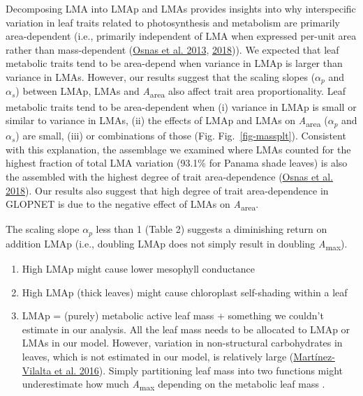 \documentclass[
  12pt,
  a4paper,
,tablecaptionabove
]{scrartcl}
\providecommand{\tightlist}{%
  \setlength{\itemsep}{0pt}\setlength{\parskip}{0pt}}
\begin{document}
Decomposing LMA into LMAp and LMAs provides insights into why
interspecific variation in leaf traits related to photosynthesis and
metabolism are primarily area-dependent (i.e., primarily independent of
LMA when expressed per-unit area rather than mass-dependent
(\protect\hyperlink{ref-Osnas2013}{Osnas et al. 2013},
\protect\hyperlink{ref-Osnas2018}{2018})). We expected that leaf
metabolic traits tend to be area-depend when variance in LMAp is larger
than variance in LMAs. However, our results suggest that the scaling
slopes (\(\alpha_p\) and \(\alpha_s\)) between LMAp, LMAs and
\emph{A}\textsubscript{area} also affect trait area proportionality.
Leaf metabolic traits tend to be area-dependent when (i) variance in
LMAp is small or similar to variance in LMAs, (ii) the effects of LMAp
and LMAs on \emph{A}\textsubscript{area} (\(\alpha_p\) and \(\alpha_s\))
are small, (iii) or combinations of those (Fig. Fig.~\ref{fig-massplt}).
Consistent with this explanation, the assemblage we examined where LMAs
counted for the highest fraction of total LMA variation (93.1\% for
Panama shade leaves) is also the assembled with the highest degree of
trait area-dependence (\protect\hyperlink{ref-Osnas2018}{Osnas et al.
2018}). Our results also suggest that high degree of trait
area-dependence in GLOPNET is due to the negative effect of LMAs on
\emph{A}\textsubscript{area}.

The scaling slope \(\alpha_p\) less than 1 (Table 2) suggests a
diminishing return on addition LMAp (i.e., doubling LMAp does not simply
result in doubling \emph{A}\textsubscript{max}).

\begin{enumerate}
\def\labelenumi{\arabic{enumi}.}
\tightlist
\item
  High LMAp might cause lower mesophyll conductance
\item
  High LMAp (thick leaves) might cause chloroplast self-shading within a
  leaf
\item
  LMAp = (purely) metabolic active leaf mass + something we couldn't
  estimate in our analysis. All the leaf mass needs to be allocated to
  LMAp or LMAs in our model. However, variation in non-structural
  carbohydrates in leaves, which is not estimated in our model, is
  relatively large
  (\protect\hyperlink{ref-Martinez-Vilalta2016}{Martínez-Vilalta et al.
  2016}). Simply partitioning leaf mass into two functions might
  underestimate how much \emph{A}\textsubscript{max} depending on the
  metabolic leaf mass .
\end{enumerate}
\end{document}
